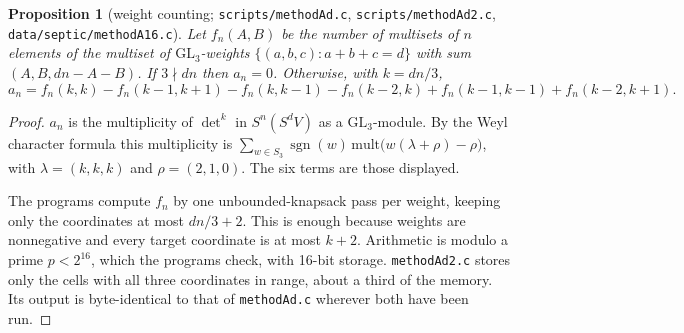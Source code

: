 \documentclass[11pt]{amsart}
\newtheorem{proposition}[theorem]{Proposition}
\theoremstyle{definition}
\theoremstyle{remark}
\newcommand{\GL}{\mathrm{GL}}
\begin{document}
\begin{proposition}[weight counting; \texttt{scripts/methodAd.c}, \texttt{scripts/methodAd2.c}, \texttt{data/septic/methodA16.c}]\label{prop:wc}
Let $f_n(A,B)$ be the number of multisets of $n$ elements of the multiset of $\GL_3$-weights $\{(a,b,c):a+b+c=d\}$ with sum $(A,B,dn-A-B)$. If $3\nmid dn$ then $a_n=0$. Otherwise, with $k=dn/3$,
\[
a_n=f_n(k,k)-f_n(k{-}1,k{+}1)-f_n(k,k{-}1)-f_n(k{-}2,k)+f_n(k{-}1,k{-}1)+f_n(k{-}2,k{+}1).
\]
\end{proposition}
\begin{proof}
$a_n$ is the multiplicity of $\det^k$ in $S^n(S^dV)$ as a $\GL_3$-module. By the Weyl character formula this multiplicity is $\sum_{w\in S_3}\operatorname{sgn}(w)\,\mathrm{mult}\bigl(w(\lambda+\rho)-\rho\bigr)$, with $\lambda=(k,k,k)$ and $\rho=(2,1,0)$. The six terms are those displayed.

The programs compute $f_n$ by one unbounded-knapsack pass per weight, keeping only the coordinates at most $dn/3+2$. This is enough because weights are nonnegative and every target coordinate is at most $k+2$. Arithmetic is modulo a prime $p<2^{16}$, which the programs check, with 16-bit storage. \texttt{methodAd2.c} stores only the cells with all three coordinates in range, about a third of the memory. Its output is byte-identical to that of \texttt{methodAd.c} wherever both have been run.
\end{proof}
\end{document}
